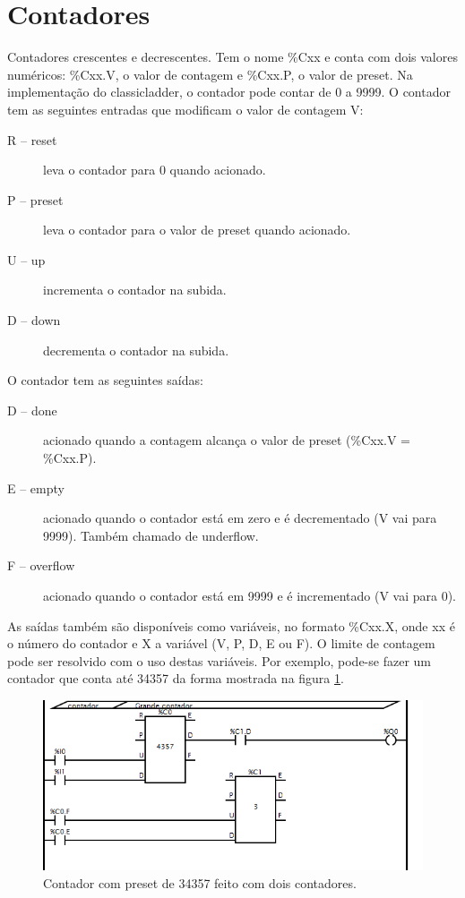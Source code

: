 \section{Contadores}

Contadores crescentes e decrescentes. Tem o nome \%Cxx e conta com dois valores numéricos: \%Cxx.V, o valor de contagem e \%Cxx.P, o valor de preset. Na implementação do classicladder, o contador pode contar de 0 a 9999. O contador tem as seguintes entradas que modificam o valor de contagem V:
\begin{description}
	\item[R -- reset] leva o contador para 0 quando acionado.
	\item[P -- preset] leva o contador para o valor de preset quando acionado.
	\item[U -- up] incrementa o contador na subida.
	\item[D -- down] decrementa o contador na subida.
\end{description}

O contador tem as seguintes saídas:
\begin{description}
	\item[D -- done] acionado quando a contagem alcança o valor de preset (\%Cxx.V = \%Cxx.P).
	\item[E -- empty] acionado quando o contador está em zero e é decrementado (V vai para 9999). Também chamado de underflow.
	\item[F -- overflow] acionado quando o contador está em 9999 e é incrementado (V vai para 0).
\end{description}

As saídas também são disponíveis como variáveis, no formato \%Cxx.X, onde xx é o número do contador e X a variável (V, P, D, E ou F). O limite de contagem pode ser resolvido com o uso destas variáveis. Por exemplo, pode-se fazer um contador que conta até 34357 da forma mostrada na figura \ref{fig:cl_grande_contador}.
\begin{figure}[hbt]
	\centering
	\includegraphics[width=\textwidth]{figuras/cl_grande_contador}
	\caption{Contador com preset de 34357 feito com dois contadores.}
	\label{fig:cl_grande_contador}
\end{figure}

